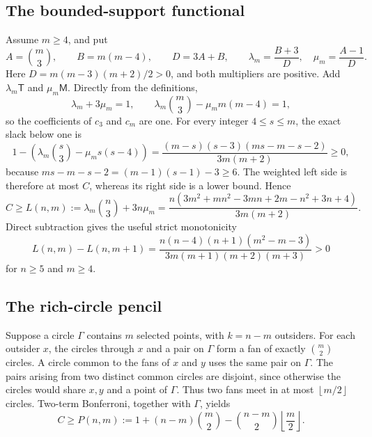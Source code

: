 \documentclass[11pt]{article}
\theoremstyle{definition}
\theoremstyle{remark}
\newcommand{\floor}[1]{\left\lfloor #1\right\rfloor}
\begin{document}
\subsection{The bounded-support functional}

Assume \(m\geq4\), and put
\[
 A=\binom m3,\qquad B=m(m-4),\qquad D=3A+B,
 \qquad
 \lambda_m=\frac{B+3}{D},\quad \mu_m=\frac{A-1}{D}.
\]
Here \(D=m(m-3)(m+2)/2>0\), and both multipliers are positive.  Add
\(\lambda_m\mathsf T\) and \(\mu_m\mathsf M\).  Directly from the
definitions,
\[
 \lambda_m+3\mu_m=1,\qquad
 \lambda_m\binom m3-\mu_m m(m-4)=1,
\]
so the coefficients of \(c_3\) and \(c_m\) are one.  For every integer
\(4\leq s\leq m\), the exact slack below one is
\begin{equation}\label{eq:slack}
 1-\left(\lambda_m\binom s3-\mu_m s(s-4)\right)
 =\frac{(m-s)(s-3)(ms-m-s-2)}{3m(m+2)}\geq0,
\end{equation}
because \(ms-m-s-2=(m-1)(s-1)-3\geq6\).  The weighted left side is
therefore at most \(C\), whereas its right side is a lower bound.  Hence
\begin{equation}\label{eq:L}
 C\geq L(n,m):=\lambda_m\binom n3+3n\mu_m
 =\frac{n(3m^2+mn^2-3mn+2m-n^2+3n+4)}{3m(m+2)}.
\end{equation}
Direct subtraction gives the useful strict monotonicity
\begin{equation}\label{eq:L-monotone}
 L(n,m)-L(n,m+1)
 =\frac{n(n-4)(n+1)(m^2-m-3)}
 {3m(m+1)(m+2)(m+3)}>0
\end{equation}
for \(n\geq5\) and \(m\geq4\).

\subsection{The rich-circle pencil}

Suppose a circle \(\Gamma\) contains \(m\) selected points, with
\(k=n-m\) outsiders.  For each outsider \(x\), the circles through \(x\)
and a pair on \(\Gamma\) form a fan of exactly \(\binom m2\) circles.  A
circle common to the fans of \(x\) and \(y\) uses the same pair on
\(\Gamma\).  The pairs arising from two distinct common circles are
disjoint, since otherwise the circles would share \(x,y\) and a point of
\(\Gamma\).  Thus two fans meet in at most \(\floor{m/2}\) circles.
Two-term Bonferroni, together with \(\Gamma\), yields
\begin{equation}\label{eq:P}
 C\geq P(n,m):=
 1+(n-m)\binom m2-\binom{n-m}{2}\floor{\frac m2}.
\end{equation}
\end{document}

